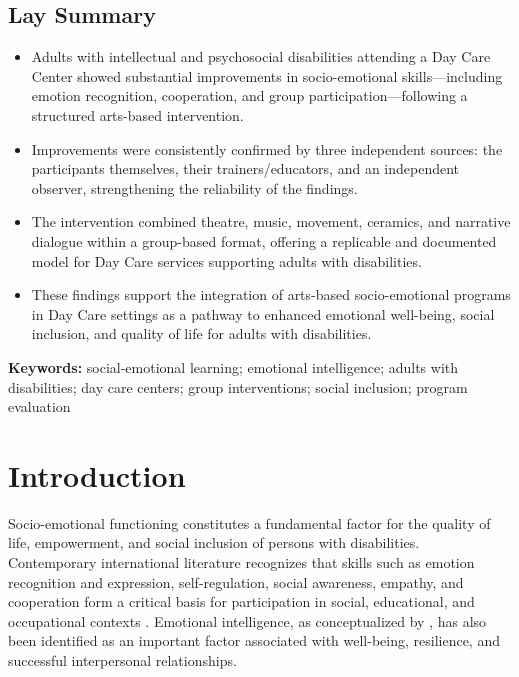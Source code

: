 \documentclass[12pt,a4paper]{article}
\begin{document}
\subsection*{Lay Summary}
\begin{itemize}
    \item Adults with intellectual and psychosocial disabilities attending a Day Care Center showed substantial improvements in socio-emotional skills---including emotion recognition, cooperation, and group participation---following a structured arts-based intervention.
    \item Improvements were consistently confirmed by three independent sources: the participants themselves, their trainers/educators, and an independent observer, strengthening the reliability of the findings.
    \item The intervention combined theatre, music, movement, ceramics, and narrative dialogue within a group-based format, offering a replicable and documented model for Day Care services supporting adults with disabilities.
    \item These findings support the integration of arts-based socio-emotional programs in Day Care settings as a pathway to enhanced emotional well-being, social inclusion, and quality of life for adults with disabilities.
\end{itemize}

\noindent\textbf{Keywords:} social-emotional learning; emotional intelligence; adults with disabilities; day care centers; group interventions; social inclusion; program evaluation

\section{Introduction}

Socio-emotional functioning constitutes a fundamental factor for the quality of life, empowerment, and social inclusion of persons with disabilities. Contemporary international literature recognizes that skills such as emotion recognition and expression, self-regulation, social awareness, empathy, and cooperation form a critical basis for participation in social, educational, and occupational contexts \parencite{casel2020,weissberg2015}. Emotional intelligence, as conceptualized by \textcite{goleman1995}, has also been identified as an important factor associated with well-being, resilience, and successful interpersonal relationships.
\end{document}
